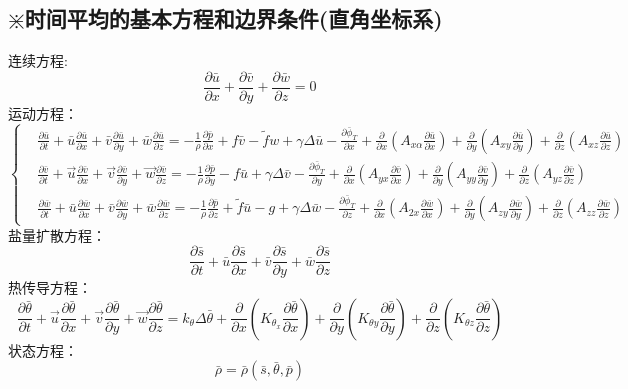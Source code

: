 \documentclass[a4paper,12pt]{article}
\begin{document}
    \subsection{ \texorpdfstring{\color{red} $\divideontimes$} 时时间平均的基本方程和边界条件(直角坐标系)}
    \begin{framed}
    连续方程:
    \[
        \frac{\partial \bar{u}}{\partial x}+\frac{\partial \bar{v}}{\partial y}+\frac{\partial \bar{w}}{\partial z}=0
    \]
    运动方程：
    \[
        \left\{
        \begin{aligned}
            &\frac{\partial \bar{u}}{\partial t}+\bar{u} \frac{\partial \bar{u}}{\partial x}+\bar{v} \frac{\partial \bar{u}}{\partial y}+\bar{w} \frac{\partial \bar{u}}{\partial z}=-\frac{1}{\rho} \frac{\partial \bar{p}}{\partial x}+f \bar{v}-\tilde{f} w+\gamma \Delta \bar{u}-\frac{\partial \bar{\phi}_{T}}{\partial x}+\frac{\partial}{\partial x}\left(A_{x \alpha} \frac{\partial \bar{u}}{\partial x}\right)+\frac{\partial}{\partial y}\left(A_{x y} \frac{\partial \bar{u}}{\partial y}\right)+\frac{\partial}{\partial z}\left(A_{x z} \frac{\partial \bar{u}}{\partial z}\right)\\
            &\frac{\partial \bar{v}}{\partial t}+\vec{u} \frac{\partial \bar{v}}{\partial x}+\vec{v} \frac{\partial \bar{v}}{\partial y}+\vec{w} \frac{\partial \bar{v}}{\partial z}=-\frac{1}{\rho} \frac{\partial \bar{p}}{\partial y}-f \bar{u}+\gamma \Delta \bar{v}-\frac{\partial \bar{\phi}_{T}}{\partial y}+\frac{\partial}{\partial x}\left(A_{y x} \frac{\partial \bar{v}}{\partial x}\right)+\frac{\partial}{\partial y}\left(A_{y y} \frac{\partial \bar{v}}{\partial y}\right)+\frac{\partial}{\partial z}\left(A_{y z} \frac{\partial \bar{v}}{\partial z}\right)\\
            &\frac{\partial \bar{w}}{\partial t}+\bar{u} \frac{\partial \bar{w}}{\partial x}+\bar{v} \frac{\partial \bar{w}}{\partial y}+\bar{w} \frac{\partial \bar{w}}{\partial z}=-\frac{1}{\rho} \frac{\partial \bar{p}}{\partial z}+\tilde{f} \bar{u}-g+\gamma \Delta \bar{w}-\frac{\partial \bar{\phi}_{T}}{\partial z}+\frac{\partial}{\partial x}\left(A_{2 x} \frac{\partial \bar{w}}{\partial x}\right)+\frac{\partial}{\partial y}\left(A_{z y} \frac{\partial \bar{w}}{\partial y}\right)+\frac{\partial}{\partial z}\left(A_{z z} \frac{\partial \bar{w}}{\partial z}\right)
        \end{aligned}
        \right.
    \]
    盐量扩散方程：
    \[
        \frac{\partial \bar{s}}{\partial t}+\bar{u} \frac{\partial \bar{s}}{\partial x}+\bar{v} \frac{\partial \bar{s}}{\partial y}+\bar{w} \frac{\partial \bar{s}}{\partial z}
    \]
    热传导方程：
    \[
        \frac{\partial \bar{\theta}}{\partial t}+\vec{u} \frac{\partial \bar{\theta}}{\partial x}+\vec{v} \frac{\partial \bar{\theta}}{\partial y}+\vec{w} \frac{\partial \bar{\theta}}{\partial z}=k_{\theta} \Delta \bar{\theta}+\frac{\partial}{\partial x}\left(K_{\theta_{x}} \frac{\partial \bar{\theta}}{\partial x}\right)+\frac{\partial}{\partial y}\left(K_{\theta y} \frac{\partial \bar{\theta}}{\partial y}\right)+\frac{\partial}{\partial z}\left(K_{\theta z} \frac{\partial \bar{\theta}}{\partial z}\right)
    \]
    状态方程：
    \[
        \bar{\rho}=\bar{\rho}(\bar{s}, \bar{\theta}, \bar{p})
    \]
    \end{framed}
\end{document}
